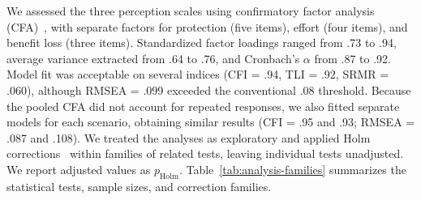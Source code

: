 We assessed the three perception scales using confirmatory factor analysis (CFA)~\cite{}, with separate factors for protection (five items), effort (four items), and benefit loss (three items).
%
Standardized factor loadings ranged from .73 to .94, average variance extracted from .64 to .76, and Cronbach's $\alpha$ from .87 to .92. Model fit was acceptable on several indices (CFI = .94, TLI = .92, SRMR = .060), although RMSEA = .099 exceeded the conventional .08 threshold. 
%
Because the pooled CFA did not account for repeated responses, we also fitted separate models for each scenario, obtaining similar results (CFI = .95 and .93; RMSEA = .087 and .108). 
%
We treated the analyses as exploratory and applied Holm corrections~\cite{} within families of related tests, leaving individual tests unadjusted. 
%
We report adjusted values as $p_{\mathrm{Holm}}$. 
%
Table~\ref{tab:analysis-families} summarizes the statistical tests, sample sizes, and correction families.

